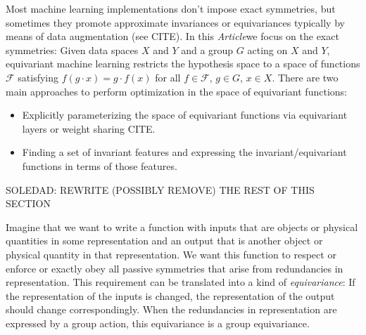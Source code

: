 \documentclass{article}
\theoremstyle{plain}
\theoremstyle{definition}
\theoremstyle{remark}
\newcommand{\documentname}{\textsl{Article}}
\begin{document}
Most machine learning implementations don't impose exact symmetries, but sometimes they promote approximate invariances or equivariances typically by means of data augmentation (see CITE). In this \documentname we focus on the exact symmetries: Given data spaces $X$ and $Y$ and a group $G$ acting on $X$ and $Y$, equivariant machine learning restricts the hypothesis space to a space of functions $\mathcal F$ satisfying  $f(g\cdot x) = g \cdot f(x)$ for all $f\in \mathcal F$, $g\in G$, $x\in X$. There are two main approaches to perform optimization in the space of equivariant functions:
\begin{itemize}
    \item Explicitly parameterizing the space of equivariant functions via equivariant layers or weight sharing CITE.
    \item Finding a set of invariant features and expressing the invariant/equivariant functions in terms of those features.
\end{itemize}



SOLEDAD: REWRITE (POSSIBLY REMOVE) THE REST OF THIS SECTION 

Imagine that we want to write a function with inputs that are objects or physical quantities in some representation and an output that is another object or physical quantity in that representation.
We want this function to respect or enforce or exactly obey all passive symmetries that arise from redundancies in representation.
This requirement can be translated into a kind of \emph{equivariance}:
If the representation of the inputs is changed, the representation of the output should change correspondingly.
When the redundancies in representation are expressed by a group action, this equivariance is a group equivariance.
\end{document}
